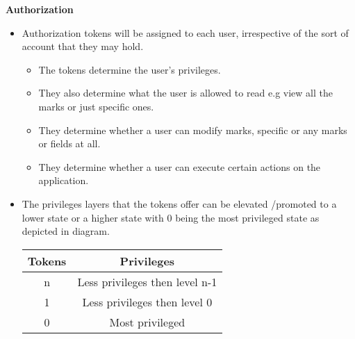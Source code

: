 \documentclass[10pt,a4paper]{article}
\begin{document}
\begin{center}\textbf{Authorization}\end{center}
                \begin{itemize}
                        \item Authorization tokens will be assigned to each user, irrespective of the sort of account that they may hold.
                        \begin{itemize}
                                \item The tokens determine the user’s privileges.
                        \end{itemize}
                        \begin{itemize}
                                \item They also determine what the user is allowed to read  e.g view all the marks or just specific ones.
                        \end{itemize}
                        \begin{itemize}
                                \item They determine whether a user can modify marks, specific or any marks or fields at all.
                        \end{itemize}
                        \begin{itemize}
                                \item They determine whether a user can execute certain actions on the application.
                        \end{itemize}
                \end{itemize}
                \begin{itemize}
                        \item
                        The privileges layers that the tokens offer can be elevated /promoted to a lower state or a higher state with 0 being the most privileged state as depicted in diagram.\linebreak\begin{tabular}{|c|c|}\hline
                        Tokens   & Privileges \\\hline
                        n & Less privileges then level n-1\\\hline
                        1 & Less privileges then level 0\\\hline
                        0 & Most privileged\\\hline
                \end{tabular}
                \end{itemize}
\end{document}
